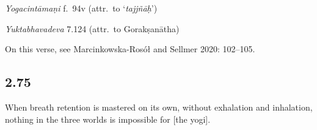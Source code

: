 \begin{ekdosis}
\begin{testimonia}[hp02_074]
\begin{versinnote}
\end{versinnote}

\emph{Yogacintāmaṇi} f.~94v (attr.~to `\emph{tajjñāḥ}')

\begin{versinnote}
\end{versinnote}


\emph{Yuktabhavadeva} 7.124 (attr.~to Gorakṣanātha)

\begin{versinnote}
\end{versinnote}


\end{testimonia}

\begin{philcomm}[hp02_074]
On this verse, see Marcinkowska-Rosół and Sellmer 2020: 102–105.
\end{philcomm}

\subsection*{2.75}
\begin{translation}[hp02_075]
When breath retention is mastered on its own, without exhalation and inhalation, nothing in the three worlds is impossible for [the yogi].
\end{translation}



\end{ekdosis}
